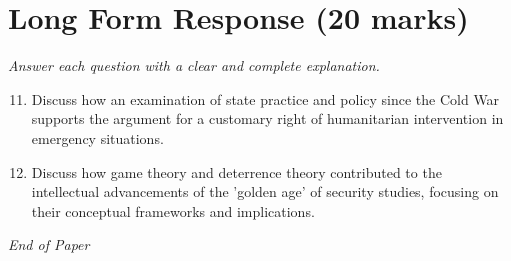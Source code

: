 \documentclass[12pt]{article}
\begin{document}
\section*{Long Form Response (20 marks)}
\textit{Answer each question with a clear and complete explanation.}
\begin{enumerate}[label=\arabic*.]
\setcounter{enumi}{10}
\item Discuss how an examination of state practice and policy since the Cold War supports the argument for a customary right of humanitarian intervention in emergency situations.
\item Discuss how game theory and deterrence theory contributed to the intellectual advancements of the 'golden age' of security studies, focusing on their conceptual frameworks and implications.
\end{enumerate}

\vfill
\noindent\textit{End of Paper}
\end{document}
